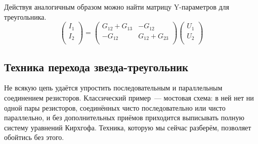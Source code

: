 \documentclass[11pt,a4paper]{article}
\begin{document}
Действуя аналогичным образом можно найти матрицу Y-параметров для треугольника.
$$
\begin{pmatrix} I_1\\ I_2\\\end{pmatrix}
=
\begin{pmatrix}
G_{12}+G_{13} & -G_{12} \\ -G_{12} & G_{12} + G_{23}\\
\end{pmatrix}
\begin{pmatrix} U_1\\ U_2\\\end{pmatrix}
$$
\subsection{Техника перехода звезда-треугольник}
Не всякую цепь удаётся упростить последовательным и параллельным
соединением резисторов. Классический пример~--- мостовая схема: в ней нет
ни одной пары резисторов, соединённых чисто последовательно или чисто
параллельно, и без дополнительных приёмов приходится выписывать полную
систему уравнений Кирхгофа. Техника, которую мы сейчас разберём, позволяет
обойтись без этого.
\end{document}
